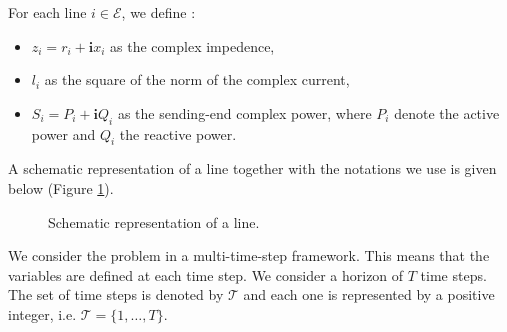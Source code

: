 For each line $i \in \mathcal{E}$, we define :
\begin{itemize}
  \item $z_i = r_i + \mathbf{i}x_i$ as the complex impedence,
  \item $l_i$ as the square of the norm of the complex current,
  \item $S_i = P_i + \mathbf{i}Q_i$ as the sending-end complex power, where $P_i$ denote the active power and $Q_i$ the reactive power.
\end{itemize}

A schematic representation of a line together with the notations we use is given below (Figure \ref{fig:line}).

\begin{figure}[H]
\centering
{}
\caption{Schematic representation of a line.}
\label{fig:line}
\end{figure}

We consider the problem in a multi-time-step framework.
This means that the variables are defined at each time step.
We consider a horizon of $T$ time steps.
The set of time steps is denoted by $\mathcal{T}$ and each one is represented by a positive integer, i.e. $\mathcal{T} = \{1, \dots, T\}$.
